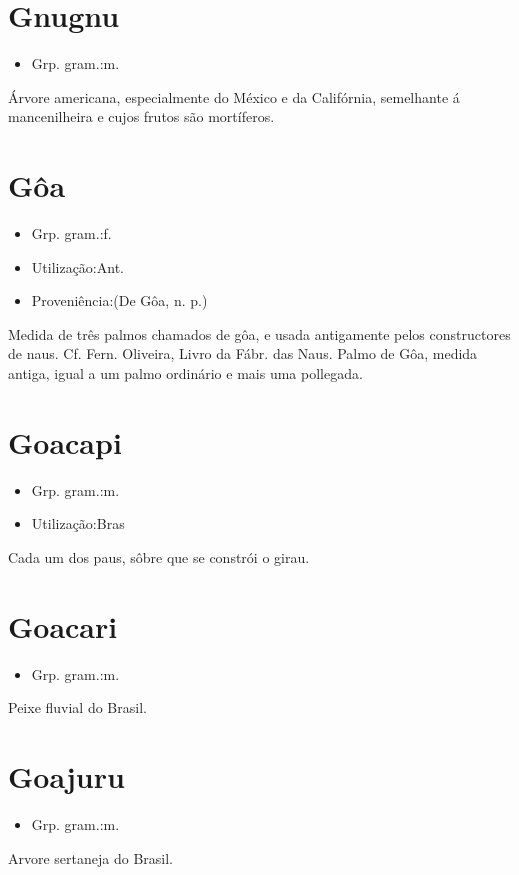 \section{Gnugnu}
\begin{itemize}
\item {Grp. gram.:m.}
\end{itemize}
Árvore americana, especialmente do México e da Califórnia, semelhante á mancenilheira e cujos frutos são mortíferos.
\section{Gôa}
\begin{itemize}
\item {Grp. gram.:f.}
\end{itemize}
\begin{itemize}
\item {Utilização:Ant.}
\end{itemize}
\begin{itemize}
\item {Proveniência:(De \textunderscore Gôa\textunderscore , n. p.)}
\end{itemize}
Medida de três palmos chamados \textunderscore de gôa\textunderscore , e usada antigamente pelos constructores de naus. Cf. Fern. Oliveira, \textunderscore Livro da Fábr. das Naus\textunderscore .
\textunderscore Palmo de Gôa\textunderscore , medida antiga, igual a um palmo ordinário e mais uma pollegada.
\section{Goacapi}
\begin{itemize}
\item {Grp. gram.:m.}
\end{itemize}
\begin{itemize}
\item {Utilização:Bras}
\end{itemize}
Cada um dos paus, sôbre que se constrói o girau.
\section{Goacari}
\begin{itemize}
\item {Grp. gram.:m.}
\end{itemize}
Peixe fluvial do Brasil.
\section{Goajuru}
\begin{itemize}
\item {Grp. gram.:m.}
\end{itemize}
Arvore sertaneja do Brasil.
